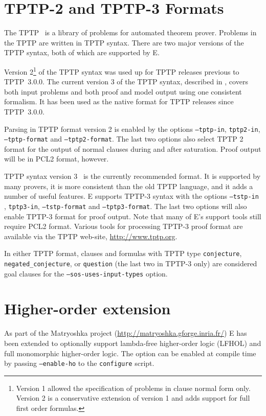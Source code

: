 \documentclass{report}
\begin{document}
\section{TPTP-2 and TPTP-3 Formats}

The TPTP~\cite{Sutcliffe:TPTP-WWW} is a library of
problems for automated theorem prover. Problems in the TPTP are
written in TPTP syntax. There are two major
versions of the TPTP syntax, both of which are supported by E.

Version 2\footnote{Version 1 allowed the specification of problems in
  clause normal form only. Version 2 is a conservative extension of
  version 1 and adds support for full first order formulas.} of the
TPTP syntax was used up for TPTP releases previous to TPTP~3.0.0.  The
current version 3 of the TPTP syntax, described in
\cite{SSCG:IJCAR-2006}, covers both input problems and both proof and
model output using one consistent formalism. It has been used as the
native format for TPTP releases since TPTP~3.0.0.

Parsing in TPTP format version 2 is enabled by the options
\texttt{--tptp-in}, \texttt{tptp2-in}, \texttt{--tptp-format} and
\texttt{--tptp2-format}. The last two options also select TPTP 2
format for the output of normal clauses during and after
saturation. Proof output will be in PCL2 format, however.

TPTP syntax version 3~\cite{SSCG:IJCAR-2006,SSCB:LPAR-2012} is the
currently recommended format. It is supported by many provers, it is
more consistent than the old TPTP language, and it adds a number of
useful features.  E supports TPTP-3 syntax with the options
\texttt{--tstp-in} , \texttt{tptp3-in}, \texttt{--tstp-format} and
\texttt{--tptp3-format}. The last two options will also enable TPTP-3
format for proof output. Note that many of E's support tools still
require PCL2 format. Various tools for processing TPTP-3 proof format
are available via the TPTP web-site, \url{http://www.tptp.org}.

In either TPTP format, clauses and formulas with TPTP type
\texttt{conjecture}, \texttt{negated\_conjecture}, or
\texttt{question} (the last two in TPTP-3 only) are considered goal
clauses for the \texttt{--sos-uses-input-types} option.

\section{Higher-order extension}

As part of the Matryoshka project
(\url{http://matryoshka.gforge.inria.fr/}) E has been extended to
optionally support lambda-free higher-order logic (LFHOL) and full
monomorphic higher-order logic. The option can be enabled at compile
time by passing \texttt{--enable-ho} to the \texttt{configure} script.
\end{document}
